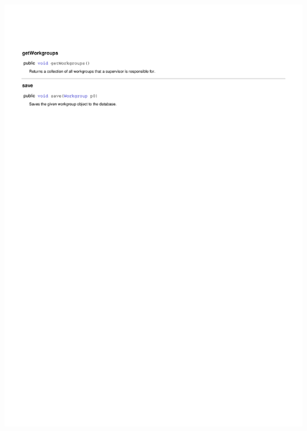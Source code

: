 \documentclass[letterpaper,12pt]{report}
\begin{document}
\includegraphics[scale=0.9,trim=20mm 30mm 25mm 25mm]{externals/PersistanceDataDictionary10.pdf}
\newpage
\end{document}
